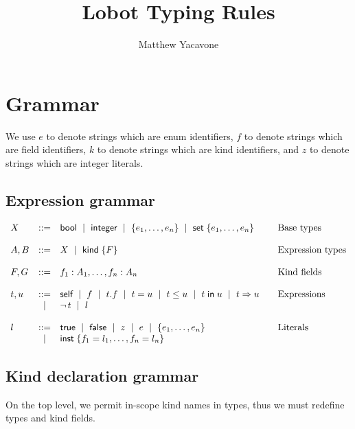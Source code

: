 \documentclass{article}
\title{Lobot Typing Rules}
\author{Matthew Yacavone}
\begin{document}
\maketitle

\section{Grammar}

We use $e$ to denote strings which are enum identifiers, $f$ to denote strings which are field identifiers, $k$ to denote strings which are kind identifiers, and $z$ to denote strings which are integer literals.

\subsection{Expression grammar}

\[ \begin{array}{lclll}
X   &::= & \BB \| \ZZ \| \{ e_1 , \ldots , e_n \} \| \kw{set}\;\{ e_1 , \ldots , e_n \}
    &&\text{Base types} \\ \\
A,B &::= & X \| \kw{kind}\;\{ F \}
    &&\text{Expression types}  \\ \\
F,G &::= & f_1 : A_1, \ldots, f_n : A_n
    &&\text{Kind fields} \\ \\
t,u &::= & \kw{self} \| f \|
           t.f \| t = u \| t \le u \| t \;\kw{in}\; u \| t \Rightarrow u
    &&\text{Expressions} \\
    &\|  & \neg t \| l \\ \\
l   &::= & \kw{true} \| \kw{false} \| z \| e \| \{ e_1 , \ldots , e_n \}
    &&\text{Literals} \\
    &\|  & \kw{inst}\;\{ f_1 = l_1, \ldots, f_n = l_n \}
\end{array} \]

\subsection{Kind declaration grammar}

On the top level, we permit in-scope kind names in types, thus we must redefine types and kind fields.
\end{document}
